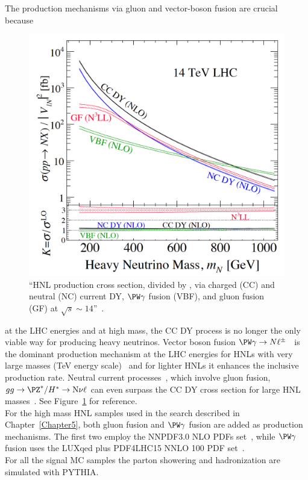The production mechanisms via gluon and vector-boson fusion are
crucial because
\begin{figure}
\centering
  \includegraphics[clip,trim=0cm 0cm 0.5cm 0.5cm, width=.39\textwidth]{Figures/c4/hnl_lhc_production}
  \caption{``HNL production cross section, divided by \mixpar, via
charged (CC) and neutral (NC) current DY, $\PW \gamma$ fusion (VBF),
and gluon fusion (GF) at $\sqrt{s}
\sim 14$\TeV ''~\cite{Pascoli_2019}.}
  \label{fig:hnl_lhc_graph}
\end{figure} 
 at the LHC energies and at high \hnl mass, the CC DY process
is no longer the only viable way for producing heavy neutrinos. 
Vector boson fusion $\PW \gamma \rightarrow N
\ell^{\pm}$~\cite{PhysRevLett.112.081801, Alva:2014gxa,Degrande_2016}
is the dominant production mechanism at the LHC 
energies for HNLs with very large masses
(TeV energy scale)~\cite{Alva:2014gxa,Degrande_2016, Pascoli_2019} and for
lighter HNLs it enhances the inclusive production rate. Neutral current
processes~\cite{PhysRevD.44.1593,WILLENBROCK1985429}, which involve
gluon fusion, $gg \rightarrow \PZ^{*}/H^{*} \rightarrow \hnl \nu \ell$
can even surpass the CC DY cross section for large HNL masses~\cite{PhysRevD.96.055042,
  Pascoli_2019}. See Figure~\ref{fig:hnl_lhc_graph} for
reference.\\
For the high mass HNL samples used in the search described in
Chapter~\ref{Chapter5}, both gluon
fusion and $\PW \gamma$
fusion are added as production mechanisms. 
The first two employ
the NNPDF3.0 NLO PDFs set~\cite{Ball_2015}, while $\PW \gamma$
fusion uses the LUXqed plus PDF4LHC15 NNLO 100
PDF set~\cite{PhysRevLett.117.242002}.\\
For all the signal MC samples the parton showering and hadronization are simulated with PYTHIA. \\

